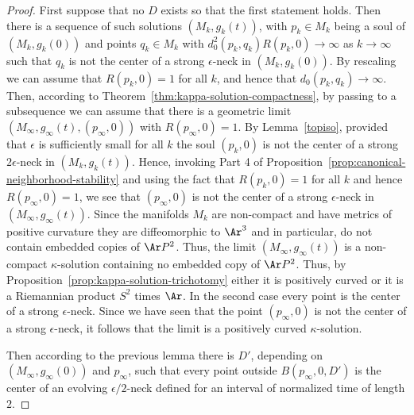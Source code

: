 \begin{proof}
First suppose that no $D$ exists so that the first statement holds.
Then there is a sequence of such solutions $(M_k,g_k(t))$, with
$p_k\in M_k$ being a soul of $(M_k,g_k(0))$ and points $q_k\in M_k$
with $d^2_0(p_k,q_k)R(p_k,0)\rightarrow\infty$ as
$k\rightarrow\infty$ such that $q_k$ is not the center of a strong
$\epsilon$-neck in $(M_k,g_k(0))$. By rescaling we can assume that
$R(p_k,0)=1$ for all $k$, and hence that
$d_0(p_k,q_k)\rightarrow\infty$. Then, according to
Theorem~\ref{thm:kappa-solution-compactness}, by passing to a subsequence we can
assume that there is a geometric limit
$(M_\infty,g_\infty(t),(p_\infty,0))$ with $R(p_\infty,0)=1$.
 By
Lemma~\ref{topiso}, provided that $\epsilon$ is sufficiently small
for all $k$ the soul $(p_k,0)$ is not the center of a strong
$2\epsilon$-neck in $(M_k,g_k(t))$.  Hence, invoking Part 4 of
Proposition~\ref{prop:canonical-neighborhood-stability} and using the fact that $R(p_k,0)=1$ for
all $k$ and hence $R(p_\infty,0)=1$, we see that $(p_\infty,0)$ is
not the center of a strong $\epsilon$-neck in
$(M_\infty,g_\infty(t))$. Since the manifolds $M_k$ are non-compact
and have metrics of positive curvature they are diffeomorphic to
$\Ar^3$ and in particular, do not contain embedded copies of $\Ar
P^2$. Thus, the limit $(M_\infty,g_\infty(t))$ is a non-compact
$\kappa$-solution containing no embedded copy of $\Ar P^2$. Thus, by
Proposition~\ref{prop:kappa-solution-trichotomy} either it is positively curved or it is a
Riemannian product $S^2$ times $\Ar$. In the second case every point
is the center of a strong $\epsilon$-neck. Since we have seen that
the point $(p_\infty,0)$ is not the center of a strong
$\epsilon$-neck, it follows that the limit is a positively curved
$\kappa$-solution.

 Then according to the previous lemma there is $D'$, depending on
$(M_\infty,g_\infty(0))$ and $p_\infty$, such that every point
outside $B(p_\infty,0,D')$ is the center of an evolving
$\epsilon/2$-neck defined for an interval of normalized time of
length $2$.


\end{proof}
